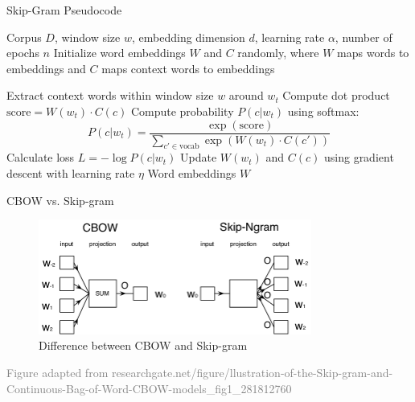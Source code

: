 \documentclass[serif, aspectratio=169]{beamer}
\begin{document}
\begin{frame}{Skip-Gram Pseudocode}
	\begin{algorithm}[H]
		\caption{Skip-Gram Model}
		\begin{algorithmic}
			\fontsize{6pt}{7.2}\selectfont
			\Require Corpus $D$, window size $w$, embedding dimension $d$, learning rate $\alpha$, number of epochs $n$
			\State Initialize word embeddings $W$ and $C$ randomly, where $W$ maps words to embeddings and $C$ maps context words to embeddings
			
			\State Extract context words within window size $w$ around $w_t$
			\State Compute dot product $\text{score} = W(w_t) \cdot C(c)$
			\State Compute probability $P(c|w_t)$ using softmax: 
			\[
			P(c|w_t) = \frac{\exp(\text{score})}{\sum_{c' \in \text{vocab}} \exp(W(w_t) \cdot C(c'))}
			\]
			\State Calculate loss $L = -\log P(c|w_t)$
			\State Update $W(w_t)$ and $C(c)$ using gradient descent with learning rate \(\eta\)
			\EndFor
			\EndFor
			\EndFor
			\EndFor
			\State \Return Word embeddings $W$
		\end{algorithmic}
	\end{algorithm}
\end{frame}




\begin{frame}{CBOW vs. Skip-gram}
    \begin{figure}
        \centering
        \includegraphics[width=0.8\textwidth]{pic/skip_vs_cbow.png}
        \caption*{Difference between CBOW and Skip-gram}
    \end{figure}
    \vspace{0.6cm}
    \hspace{-1.0cm}
    {\tiny \textcolor{gray}{Figure adapted from researchgate.net/figure/llustration-of-the-Skip-gram-and-Continuous-Bag-of-Word-CBOW-models_fig1_281812760}}
\end{frame}
\end{document}
